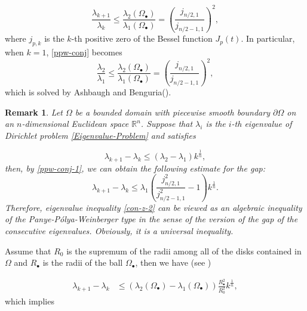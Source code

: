 \documentclass[12pt]{article}
\newtheorem{rem}[thm]{Remark}
\numberwithin{equation}{section}
\begin{document}
\begin{equation}\label{ppw-conj}\frac{\lambda_{k+1}}{\lambda_{k}}
\leq
\frac{\lambda_{2}(\Omega_{\bullet})}{\lambda_{1}(\Omega_{\bullet})}=\left(\frac{j_{n/2,1}}{j_{n/2-1,1}}\right)^{2},\end{equation}
where $j_{p,k}$ is the $k$-th positive zero of the Bessel
function $J_{p}(t)$.
In particular, when $k=1$, \eqref{ppw-conj} becomes
\begin{equation}\label{ppw-conj-1}\frac{\lambda_{2}}{\lambda_{1}}
\leq
\frac{\lambda_{2}(\Omega_{\bullet})}{\lambda_{1}(\Omega_{\bullet})}=\left(\frac{j_{n/2,1}}{j_{n/2-1,1}}\right)^{2},\end{equation}which is solved by Ashbaugh and Benguria(\cite{Ash2,Ash3,Ash4}).


\begin{rem}\label{gap-conj-z-2}
Let $\Omega$ be a bounded domain with piecewise smooth boundary $\partial\Omega$ on an $n$-dimensional Euclidean space
$\mathbb{R}^{n}$. Suppose that $\lambda_{i}$ is the $i$-th eigenvalue of Dirichlet problem \eqref{Eigenvalue-Problem} and satisfies

\begin{equation}\label{con-z-2} \lambda_{k+1}-\lambda_{k}\leq (\lambda_{2}-\lambda_{1})k^{\frac{1}{n}},
\end{equation}then, by \eqref{ppw-conj-1}, we can obtain the following estimate for the gap:
\begin{equation}\label{con-z-2} \lambda_{k+1}-\lambda_{k}\leq \lambda_{1}\left(\frac{j_{n/2,1}^{2}}{j_{n/2-1,1}^{2}}-1\right)k^{\frac{1}{n}}.
\end{equation}Therefore, eigenvalue inequality \eqref{con-z-2}  can be viewed as an algebraic inequality of  the Panye-P\'{o}lya-Weinberger type in the sense of the version of the gap of the consecutive eigenvalues. Obviously, it is a universal inequality.\end{rem}

Assume that  $R_{0}$ is the supremum of the radii among all of
the disks contained in $\Omega$   and $R_{\bullet}$ is the radii of the ball $\Omega_{\bullet}$, then we have (see {\rm\cite{Ash3,Siu2}})

\begin{equation*}\begin{aligned} \lambda_{k+1}-\lambda_{k}&\leq (\lambda_{2}(\Omega_{\bullet})-\lambda_{1}(\Omega_{\bullet}))\frac{R_{\bullet}^{2}}{R^{2}_{0}}k^{\frac{1}{n}},\end{aligned} \end{equation*}
which implies
\end{document}
